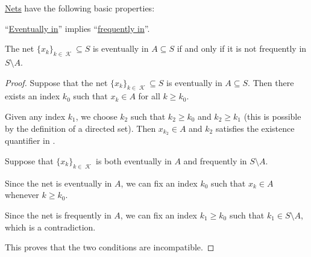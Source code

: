 \begin{proposition}\label{thm:topological_net_properties}
  \hyperref[def:topological_net]{Nets} have the following basic properties:

  \begin{thmenum}
     \enquote{\hyperref[def:topological_net/eventually_in]{Eventually in}} implies \enquote{\hyperref[def:topological_net/frequently_in]{frequently in}}.

     The net \( \{ x_k \}_{k \in \mscrK} \subseteq S \) is eventually in \( A \subseteq S \) if and only if it is not frequently in \( S \setminus A \).
  \end{thmenum}
\end{proposition}
\begin{proof}
   Suppose that the net \( \{ x_k \}_{k \in \mscrK} \subseteq S \) is eventually in \( A \subseteq S \). Then there exists an index \( k_0 \) such that \( x_k \in A \) for all \( k \geq k_0 \).

  Given any index \( k_1 \), we choose \( k_2 \) such that \( k_2 \geq k_0 \) and \( k_2 \geq k_1 \) (this is possible by the definition of a directed set). Then \( x_{k_2} \in A \) and \( k_2 \) satisfies the existence quantifier in .

   Suppose that \( \{ x_k \}_{k \in \mscrK} \) is both eventually in \( A \) and frequently in \( S \setminus A \).

  Since the net is eventually in \( A \), we can fix an index \( k_0 \) such that \( x_k \in A \) whenever \( k \geq k_0 \).

  Since the net is frequently in \( A \), we can fix an index \( k_1 \geq k_0 \) such that \( k_1 \in S \setminus A \), which is a contradiction.

  This proves that the two conditions are incompatible.
\end{proof}

